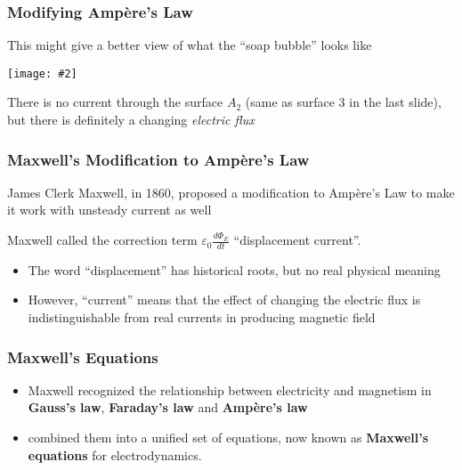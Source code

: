 \documentclass[12pt,aspectratio=169]{beamer}
\newcommand{\pic}[2]{\texttt{[image: \#2]}}\newcommand{\mb}[1]{\mathbf{#1}}
\newcommand{\eq}[2]{\vspace{#1}{\Large\begin{displaymath}#2\end{displaymath}}}
\begin{document}
\begin{frame}
  \frametitle{Modifying Amp\`{e}re's Law}
  This might give a better view of what the ``soap bubble'' looks like
  \begin{center}
    \pic{.5}{bubble.png}
  \end{center}
  There is no current through the surface $A_2$ (same as surface \num{3} in the
  last slide), but there is definitely a changing \emph{electric flux}
\end{frame}


\begin{frame}
  \frametitle{Maxwell's Modification to Amp\`{e}re's Law}
  James Clerk Maxwell, in 1860, proposed a modification to Amp\`{e}re's Law
  to make it work with unsteady current as well

  \eq{-.1in}{
    \boxed{
      \oint\mb{B}\cdot d\boldsymbol{\ell}=\mu_0 I +
      \mu_0\varepsilon_0 \frac{d\Phi_E}{dt}
    }
  }

  Maxwell called the correction term
  $\displaystyle \varepsilon_0\frac{d\Phi_E}{dt}$ ``displacement current''.
  \begin{itemize}
  \item The word ``displacement'' has historical roots, but no real physical
    meaning
  \item However, ``current'' means that the effect of changing the electric
    flux is indistinguishable from real currents in producing magnetic field
  \end{itemize}
\end{frame}


\begin{frame}
  \frametitle{Maxwell's Equations}
  \begin{itemize}
  \item Maxwell recognized the relationship between electricity and
    magnetism in \textbf{Gauss's law}, \textbf{Faraday's law} and
    \textbf{Amp\`{e}re's law}
  \item combined them into a unified set of equations, now known as
    \textbf{Maxwell's equations} for electrodynamics.
  \end{itemize}
\end{frame}
\end{document}
